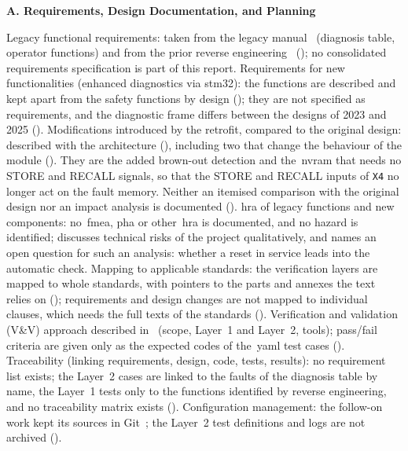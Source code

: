 \noindent\textbf{A. Requirements, Design Documentation, and Planning}
\begin{checklist}
	 Legacy functional requirements: taken from the legacy manual~\cite{rexroth1992wsp} (diagnosis table, operator functions) and from the prior reverse engineering~\cite{ayoub2014, leyer2023} (); no consolidated requirements specification is part of this report.
	 Requirements for new functionalities (enhanced diagnostics via \gls{stm32}): the functions are described and kept apart from the safety functions by design (); they are not specified as requirements, and the diagnostic frame differs between the designs of 2023 and 2025 ().
	 Modifications introduced by the retrofit, compared to the original design: described with the architecture (), including two that change the behaviour of the module (). They are the added brown-out detection and the~\gls{nvram} that needs no STORE and RECALL signals, so that the STORE and RECALL inputs of \texttt{X4} no longer act on the fault memory. Neither an itemised comparison with the original design nor an impact analysis is documented ().
	 \Gls{hra} of legacy functions and new components: no~\gls{fmea}, \gls{pha} or other~\gls{hra} is documented, and no hazard is identified;  discusses technical risks of the project qualitatively, and  names an open question for such an analysis: whether a reset in service leads into the automatic check.
	 Mapping to applicable standards: the verification layers are mapped to whole standards, with pointers to the parts and annexes the text relies on (); requirements and design changes are not mapped to individual clauses, which needs the full texts of the standards ().
	 Verification and validation (V\&V) approach described in~ (scope, Layer~1 and Layer~2, tools); pass/fail criteria are given only as the expected codes of the~\gls{yaml} test cases ().
	 Traceability (linking requirements, design, code, tests, results): no requirement list exists; the Layer~2 cases are linked to the faults of the diagnosis table by name, the Layer~1 tests only to the functions identified by reverse engineering, and no traceability matrix exists ().
	 Configuration management: the follow-on work kept its sources in Git~\cite[p.~7]{savchuk2025}; the Layer~2 test definitions and logs are not archived ().
\end{checklist}

